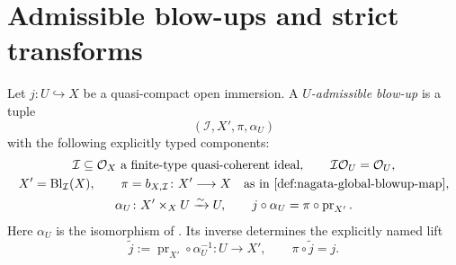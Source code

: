 \section{Admissible blow-ups and strict transforms}

\begin{definition}
  \label{def:nagata-admissible-blowup}

  Let $j\colon U\hookrightarrow X$ be a quasi-compact open immersion.  A
  \emph{$U$-admissible blow-up} is a tuple
  \[
    (\mathcal I,X',\pi,\alpha_U)
  \]
  with the following explicitly typed components:
  \[
  \begin{gathered}
    \mathcal I\subseteq\mathcal O_X
       \text{ a finite-type quasi-coherent ideal},\qquad
    \mathcal I\mathcal O_U=\mathcal O_U,\\
    X'=\operatorname{Bl}_{\mathcal I}(X),\qquad
    \pi=b_{X,\mathcal I}\colon X'\longrightarrow X
       \quad\text{as in \Cref{def:nagata-global-blowup-map}},\\
    \alpha_U\colon X'\times_XU\xrightarrow{\sim}U,\qquad
    j\circ\alpha_U
      =\pi\circ\operatorname{pr}_{X'}.
  \end{gathered}
  \]
  Here $\alpha_U$ is the isomorphism of
  .  Its inverse determines the
  explicitly named lift
  \[
    \widetilde j
      :=\operatorname{pr}_{X'}\circ\alpha_U^{-1}
      \colon U\longrightarrow X',
    \qquad
    \pi\circ\widetilde j=j.
  \]
\end{definition}

